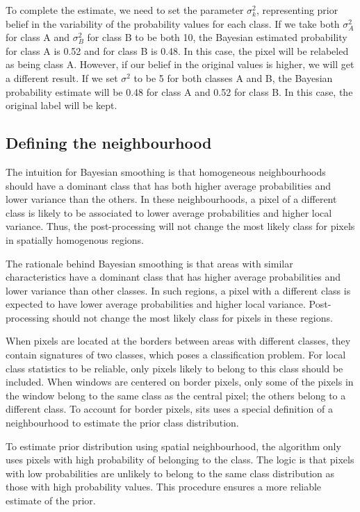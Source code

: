 \documentclass[
]{jss}
\begin{document}
To complete the estimate, we need to set the parameter \(\sigma^2_{k}\), representing prior
belief in the variability of the probability values for each class. If we take both
\(\sigma^2_{A}\) for class A and \(\sigma^2_{B}\) for class B to be both 10, the Bayesian
estimated probability for class A is 0.52 and for class B is 0.48. In this case, the pixel
will be relabeled as being class A. However, if our belief in the original values is higher,
we will get a different result. If we set \(\sigma^2\) to be 5 for both classes A and B,
the Bayesian probability estimate will be 0.48 for class A and 0.52 for class B.
In this case, the original label will be kept.

\hypertarget{defining-the-neighbourhood}{%
\subsection{Defining the neighbourhood}\label{defining-the-neighbourhood}}

The intuition for Bayesian smoothing is that homogeneous neighbourhoods should have a
dominant class that has both higher average probabilities and lower variance than the others.
In these neighbourhoods, a pixel of a different class is likely to be associated
to lower average probabilities and higher local variance. Thus, the post-processing
will not change the most likely class for pixels in spatially homogenous regions.

The rationale behind Bayesian smoothing is that areas with similar characteristics have a dominant class that has higher average probabilities and lower variance than other classes.
In such regions, a pixel with a different class is expected to have lower average
probabilities and higher local variance. Post-processing should not change the most likely
class for pixels in these regions.

When pixels are located at the borders between areas with different classes, they contain
signatures of two classes, which poses a classification problem. For local class statistics to be reliable, only pixels likely to belong to this class should be included. When windows are
centered on border pixels, only some of the pixels in the window belong to the same class as the central pixel; the others belong to a different class. To account for border pixels,
sits uses a special definition of a neighbourhood to estimate the prior class distribution.

To estimate prior distribution using spatial neighbourhood, the algorithm only uses
pixels with high probability of belonging to the class. The logic is that pixels with
low probabilities are unlikely to belong to the same class distribution as those with
high probability values. This procedure ensures a more reliable estimate of the prior.
\end{document}

